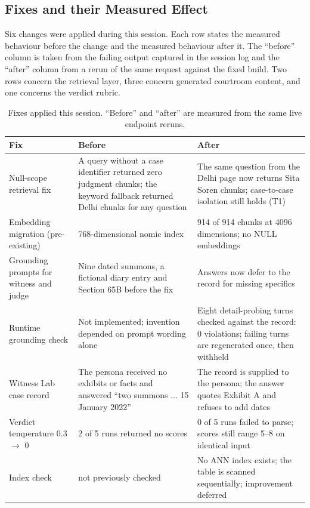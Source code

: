 \documentclass[12pt]{article}
\begin{document}
\subsection{Fixes and their Measured Effect}
Six changes were applied during this session. Each row states the measured behaviour before the change and the measured behaviour after it. The ``before'' column is taken from the failing output captured in the session log and the ``after'' column from a rerun of the same request against the fixed build. Two rows concern the retrieval layer, three concern generated courtroom content, and one concerns the verdict rubric.
\begin{table}[H]
\centering
\small
\caption{Fixes applied this session. ``Before'' and ``after'' are measured from the same live endpoint reruns.}
\label{tab:fixes}
\begin{tabularx}{0.98\textwidth}{p{}p{}p{}}
\toprule
Fix & Before & After \\
\midrule
Null-scope retrieval fix & A query without a case identifier returned zero judgment chunks; the keyword fallback returned Delhi chunks for any question & The same question from the Delhi page now returns Sita Soren chunks; case-to-case isolation still holds (T1) \\
Embedding migration (pre-existing) & 768-dimensional nomic index & 914 of 914 chunks at 4096 dimensions; no NULL embeddings \\
Grounding prompts for witness and judge & Nine dated summons, a fictional diary entry and Section 65B before the fix & Answers now defer to the record for missing specifics \\
Runtime grounding check & Not implemented; invention depended on prompt wording alone & Eight detail-probing turns checked against the record: 0 violations; failing turns are regenerated once, then withheld \\
Witness Lab case record & The persona received no exhibits or facts and answered ``two summons ... 15 January 2022'' & The record is supplied to the persona; the answer quotes Exhibit A and refuses to add dates \\
Verdict temperature 0.3 $\rightarrow$ 0 & 2 of 5 runs returned no scores & 0 of 5 runs failed to parse; scores still range 5--8 on identical input \\
Index check & not previously checked & No ANN index exists; the table is scanned sequentially; improvement deferred \\
\bottomrule
\end{tabularx}
\end{table}
\FloatBarrier
\end{document}
